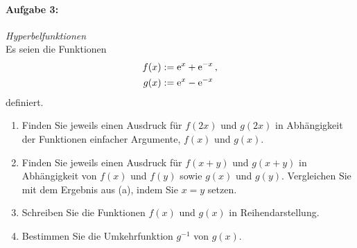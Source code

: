 \paragraph{Aufgabe 3: } \emph{Hyperbelfunktionen}\\[0.2cm]
Es seien die Funktionen
\begin{align*}
    f(x)&:=\mathrm{e}^{x}+\mathrm{e}^{-x}\,,\\
    g(x)&:=\mathrm{e}^{x}-\mathrm{e}^{-x}
\end{align*}
definiert.
\begin{enumerate}[label=(\alph*)]
    \item Finden Sie jeweils einen Ausdruck für $f(2x)$ und $g(2x)$ in Abhängigkeit der Funktionen einfacher Argumente, $f(x)$ und $g(x)$.
    \item Finden Sie jeweils einen Ausdruck für $f(x+y)$ und $g(x+y)$ in Abhängigkeit von $f(x)$ und $f(y)$ sowie $g(x)$ und $g(y)$. Vergleichen Sie mit dem Ergebnis aus (a), indem Sie $x=y$ setzen.
    \item Schreiben Sie die Funktionen $f(x)$ und $g(x)$ in Reihendarstellung.
    \item Bestimmen Sie die Umkehrfunktion $g^{-1}$ von $g(x)$.
\end{enumerate}